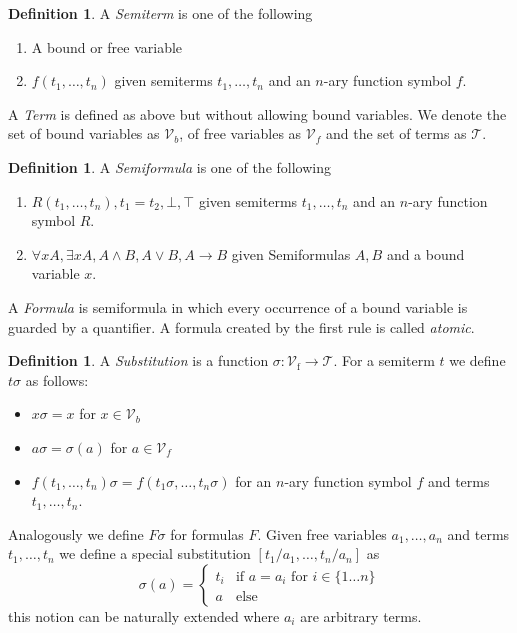 \documentclass[a4paper,12pt]{article}
\theoremstyle{definition}
\theoremstyle{definition}
\theoremstyle{definition}
\theoremstyle{definition}
\theoremstyle{definition}
\newtheorem{definition}[theorem]{Definition}
\theoremstyle{definition}
\begin{document}
	\begin{definition}
		A \textit{Semiterm} is one of the following
		\begin{enumerate}
			\item A bound or free variable
			\item $f(t_1, \dots, t_n)$ given semiterms $t_1,\dots,t_n$ and an $n$-ary function symbol $f$.
		\end{enumerate}
		A \textit{Term} is defined as above but without allowing bound variables. We denote the set of bound variables as $\mathcal{V}_b$, of free variables as $\mathcal{V}_f$ and the set of terms as $\mathcal{T}$.
	\end{definition}
	
	\begin{definition}
		A \textit{Semiformula} is one of the following
		\begin{enumerate}
			\item $R(t_1, \dots, t_n), t_1 = t_2, \bot, \top$ given semiterms $t_1,\dots,t_n$ and an $n$-ary function symbol $R$.
			\item $\forall x A, \exists x A, A\wedge B, A\vee B, A\to B$ given Semiformulas $A, B$ and a bound variable $x$.
		\end{enumerate}
		A \textit{Formula} is semiformula in which every occurrence of a bound variable is guarded by a quantifier. A formula created by the first rule is called \textit{atomic}.
	\end{definition}
	
	\begin{definition}
		A \textit{Substitution} is a function $\sigma: \mathcal{V}_\text{f}\to\mathcal{T}$. For a semiterm $t$ we define $t\sigma$ as follows:
		\begin{itemize}
			\item $x\sigma = x$ for $x\in \mathcal{V}_b$
			\item $a\sigma = \sigma(a)$ for $a\in \mathcal{V}_f$
			\item $f(t_1,\dots,t_n)\sigma = f(t_1\sigma,\dots,t_n\sigma)$ for an $n$-ary function symbol $f$ and terms $t_1,\dots,t_n$.
		\end{itemize}
		Analogously we define $F\sigma$ for formulas $F$. Given free variables $a_1,\dots,a_n$ and terms $t_1,\dots,t_n$ we define a special substitution $[t_1/a_1,\dots,t_n/a_n]$ as $$\sigma(a) = \begin{cases}
			t_i & \text{if } a = a_i \text{ for } i \in \{1\dots n\}\\
			a & \text{else}
		\end{cases}$$this notion can be naturally extended where $a_i$ are arbitrary terms.
	\end{definition}
	
\end{document}
